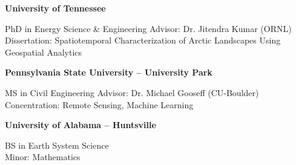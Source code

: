 \documentclass{tidycv} %
\begin{document}
\begin{cveducations}
  
    {{\bf University of Tennessee}} %
    {
    \begin{cveducationitems} %
        PhD in Energy Science \& Engineering \hfill Advisor: Dr. Jitendra Kumar (ORNL)\\ Dissertation: Spatiotemporal  Characterization of Arctic Landscapes Using Geospatial Analytics\\
	\end{cveducationitems}
    }
    
    {{\bf Pennsylvania State University -- University Park}} %
    {
    \begin{cveducationitems} %
        MS in Civil Engineering \hfill Advisor: Dr. Michael Gooseff (CU-Boulder) \\ Concentration: Remote Sensing, Machine Learning\\
	\end{cveducationitems}
    }
    
    {{\bf University of Alabama -- Huntsville}} %
    {
    \begin{cveducationitems} %
        BS in Earth System Science \\Minor: Mathematics\\
	\end{cveducationitems}
    }    
    
    
\end{cveducations}
\end{document}
